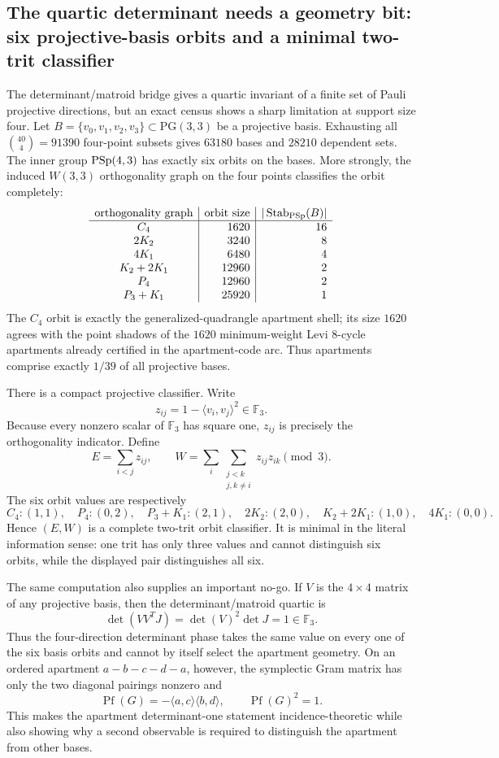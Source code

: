 \subsection{The quartic determinant needs a geometry bit: six projective-basis orbits and a minimal two-trit classifier}

The determinant/matroid bridge gives a quartic invariant of a finite set of Pauli
projective directions, but an exact census shows a sharp limitation at support size
four.  Let $B=\{v_0,v_1,v_2,v_3\}\subset\mathrm{PG}(3,3)$ be a projective basis.
Exhausting all $\binom{40}{4}=91390$ four-point subsets gives $63180$ bases and
$28210$ dependent sets.  The inner group $\mathrm{PSp}(4,3)$ has exactly six orbits on the
bases.  More strongly, the induced $W(3,3)$ orthogonality graph on the four points
classifies the orbit completely:
\[
\begin{array}{c|r|r}
\text{orthogonality graph}&\text{orbit size}&|\operatorname{Stab}_{\mathrm{PSp}}(B)|\\\hline
C_4&1620&16\\
2K_2&3240&8\\
4K_1&6480&4\\
K_2+2K_1&12960&2\\
P_4&12960&2\\
P_3+K_1&25920&1
\end{array}
\]
The $C_4$ orbit is exactly the generalized-quadrangle apartment shell; its size
$1620$ agrees with the point shadows of the $1620$ minimum-weight Levi $8$-cycle
apartments already certified in the apartment-code arc.  Thus apartments comprise
exactly $1/39$ of all projective bases.

There is a compact projective classifier.  Write
\[
 z_{ij}=1-\langle v_i,v_j\rangle^2\in\mathbb F_3.
\]
Because every nonzero scalar of $\mathbb F_3$ has square one, $z_{ij}$ is precisely
the orthogonality indicator.  Define
\[
 E=\sum_{i<j}z_{ij},\qquad
 W=\sum_i\sum_{\substack{j<k\\j,k\ne i}}z_{ij}z_{ik}\pmod3.
\]
The six orbit values are respectively
\[
 C_4:(1,1),\quad P_4:(0,2),\quad P_3{+}K_1:(2,1),\quad
 2K_2:(2,0),\quad K_2{+}2K_1:(1,0),\quad 4K_1:(0,0).
\]
Hence $(E,W)$ is a complete two-trit orbit classifier.  It is minimal in the
literal information sense: one trit has only three values and cannot distinguish six
orbits, while the displayed pair distinguishes all six.

The same computation also supplies an important no-go.  If $V$ is the $4\times4$
matrix of any projective basis, then the determinant/matroid quartic is
\[
 \det(VV^T J)=\det(V)^2\det J=1\in\mathbb F_3.
\]
Thus the four-direction determinant phase takes the same value on every one of the six
basis orbits and cannot by itself select the apartment geometry.  On an ordered apartment
$a-b-c-d-a$, however, the symplectic Gram matrix has only the two diagonal pairings
nonzero and
\[
 \operatorname{Pf}(G)=-\langle a,c\rangle\langle b,d\rangle,
 \qquad \operatorname{Pf}(G)^2=1.
\]
This makes the apartment determinant-one statement incidence-theoretic while also showing
why a second observable is required to distinguish the apartment from other bases.

